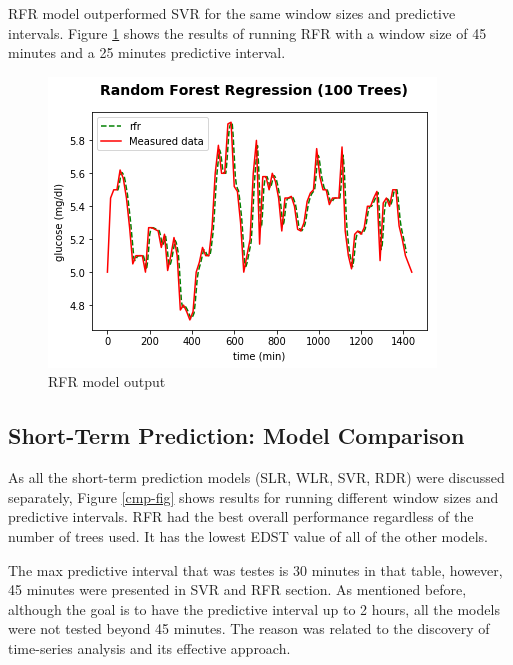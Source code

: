 RFR model outperformed SVR for the same window sizes and predictive intervals. Figure \ref{rfr-fig} shows the results of running RFR with a window size of 45 minutes and a 25 minutes predictive interval.


\begin{center}
\begin{figure}[ht!]
	\centering
    \includegraphics[width=\textwidth]{Figures/mo/rfr.png}
 	\caption{RFR model output}
  	\label{rfr-fig}
\end{figure}
\end{center}

\pagebreak 

\subsection{Short-Term Prediction: Model Comparison}
As all the short-term prediction models (SLR, WLR, SVR, RDR) were discussed separately, Figure \ref{cmp-fig} shows results for running different window sizes and predictive intervals. RFR had the best overall performance regardless of the number of trees used. It has the lowest EDST value of all of the other models. 

The max predictive interval that was testes is 30 minutes in that table, however, 45 minutes were presented in SVR and RFR section. As mentioned before, although the goal is to have the predictive interval up to 2 hours, all the models were not tested beyond 45 minutes. The reason was related to the discovery of time-series analysis and its effective approach. 

